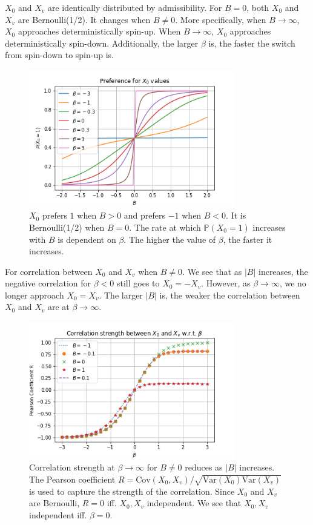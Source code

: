 \documentclass[12pt]{article}
\numberwithin{equation}{section}
\begin{document}
$X_0$ and $X_v$ are identically distributed by admissibility. For $B=0$, both $X_0$ and $X_v$ are Bernoulli(1/2). It changes when $B\neq 0$. More
specifically, when $B\rightarrow\infty$, $X_0$ approaches deterministically spin-up. When $B\rightarrow\infty$, $X_0$ approaches deterministically spin-down.
Additionally, the larger $\beta$ is, the faster the switch from spin-down to spin-up is.

\newpage

\begin{figure}[h]
    \centering
    \includegraphics[width=9cm]{img/ising_x0_B.png}
    \caption{$X_0$ prefers $1$ when $B > 0$ and prefers $-1$ when $B < 0$. It is Bernoulli(1/2) when $B=0$. The rate at which $\mathbb{P}(X_0=1)$ increases with $B$ is dependent on $\beta$. The higher the value of $\beta$, the faster it increases.}
    \label{Fig.ising-x0-B}
\end{figure}

For correlation between $X_0$ and $X_v$ when $B\neq 0$. We see that as $|B|$
increases, the negative correlation for $\beta<0$ still goes to $X_0=-X_v$.
However, as $\beta\rightarrow\infty$, we no longer approach $X_0=X_v$. The larger
$|B|$ is, the weaker the correlation between $X_0$ and $X_v$ are at
$\beta\rightarrow\infty$.

\begin{figure}[h]
    \centering
    \includegraphics[width=9cm]{img/ising_x0_xv_pearson.png}
    \caption{Correlation strength at $\beta\rightarrow\infty$ for $B\neq 0$ reduces
        as $|B|$ increases. The Pearson coefficient $R=\text{Cov}(X_0, X_v)/\sqrt{\text{Var}(X_0)\text{Var}(X_v)}$ is used to capture the strength of the correlation. Since $X_0$ and $X_v$ are Bernoulli, $R=0$ iff. $X_0, X_v$ independent. We see that $X_0, X_v$ independent iff. $\beta=0$.}
    \label{Fig. ising_x0_xv_B}
\end{figure}
\end{document}
